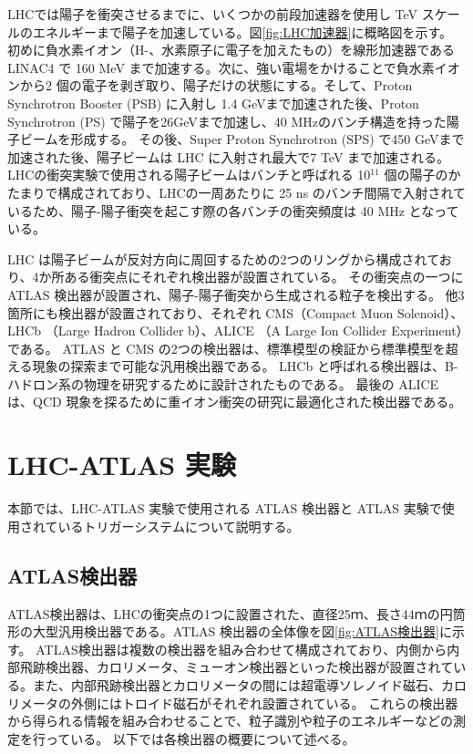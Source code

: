 LHCでは陽子を衝突させるまでに、いくつかの前段加速器を使用し TeV スケールのエネルギーまで陽子を加速している。図\ref{fig:LHC加速器}に概略図を示す。
初めに負水素イオン（H-、水素原子に電子を加えたもの）を線形加速器である LINAC4 で 160 MeV まで加速する。次に、強い電場をかけることで負水素イオンから2 個の電子を剥ぎ取り、陽子だけの状態にする。そして、Proton Synchrotron Booster (PSB) に入射し 1.4 GeVまで加速された後、Proton Synchrotron (PS) で陽子を26GeVまで加速し、40 MHzのバンチ構造を持った陽子ビームを形成する。
その後、Super Proton Synchrotron (SPS) で450 GeVまで加速された後、陽子ビームは LHC に入射され最大で7 TeV まで加速される。
LHCの衝突実験で使用される陽子ビームはバンチと呼ばれる 10${^11}$ 個の陽子のかたまりで構成されており、LHCの一周あたりに 25 ns のバンチ間隔で入射されているため、陽子-陽子衝突を起こす際の各バンチの衝突頻度は 40 MHz となっている。

LHC は陽子ビームが反対方向に周回するための2つのリングから構成されており、4か所ある衝突点にそれぞれ検出器が設置されている。
その衝突点の一つに　ATLAS 検出器が設置され、陽子-陽子衝突から生成される粒子を検出する。
他3箇所にも検出器が設置されており、それぞれ CMS（Compact Muon Solenoid）、LHCb （Large Hadron Collider b）、ALICE （A Large Ion Collider Experiment）である。
ATLAS と CMS の2つの検出器は、標準模型の検証から標準模型を超える現象の探索まで可能な汎用検出器である。
LHCb と呼ばれる検出器は、B-ハドロン系の物理を研究するために設計されたものである。
最後の ALICE は、QCD 現象を探るために重イオン衝突の研究に最適化された検出器である。


\section{LHC-ATLAS 実験}\label{section2-2}
本節では、LHC-ATLAS 実験で使用される ATLAS 検出器と ATLAS 実験で使用されているトリガーシステムについて説明する。

\subsection{ATLAS検出器}
ATLAS検出器は、LHCの衝突点の1つに設置された、直径25ｍ、長さ44ｍの円筒形の大型汎用検出器である。ATLAS 検出器の全体像を図\ref{fig:ATLAS検出器}に示す。
ATLAS検出器は複数の検出器を組み合わせて構成されており、内側から内部飛跡検出器、カロリメータ、ミューオン検出器といった検出器が設置されている。また、内部飛跡検出器とカロリメータの間には超電導ソレノイド磁石、カロリメータの外側にはトロイド磁石がそれぞれ設置されている。
これらの検出器から得られる情報を組み合わせることで、粒子識別や粒子のエネルギーなどの測定を行っている。
以下では各検出器の概要について述べる。

